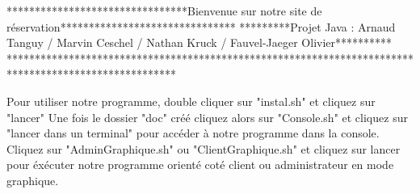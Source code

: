 ********************************Bienvenue sur notre site de réservation*******************************
*********Projet Java : Arnaud Tanguy / Marvin Ceschel / Nathan Kruck / Fauvel-Jaeger Olivier**********
******************************************************************************************************

Pour utiliser notre programme, double cliquer sur "instal.sh" et cliquez sur "lancer"
Une fois le dossier "doc" créé cliquez alors sur "Console.sh" et cliquez sur "lancer dans un terminal" pour accéder à notre programme dans la console.
Cliquez sur "AdminGraphique.sh" ou "ClientGraphique.sh" et cliquez sur lancer pour éxécuter notre programme orienté coté client ou administrateur en mode graphique. 

